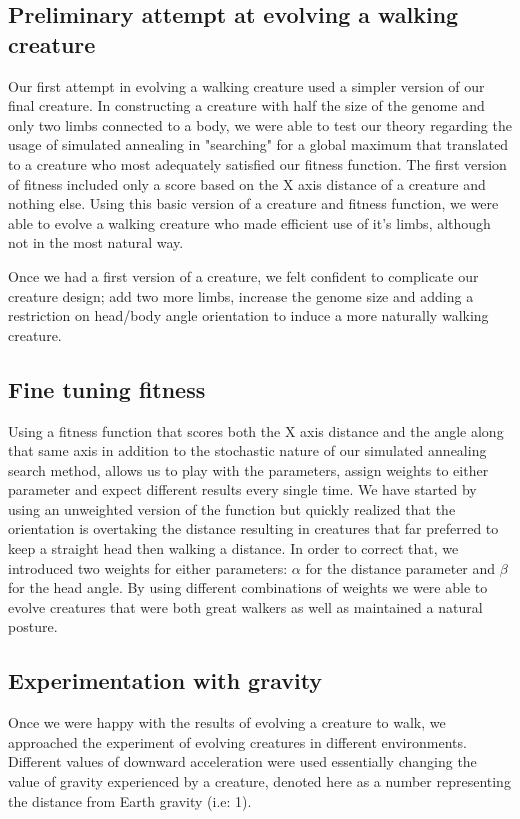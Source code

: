 \documentclass[letterpaper, 10 pt, conference]{ieeeconf}  %
\begin{document}
\subsection{Preliminary attempt at evolving a walking creature}
Our first attempt in evolving a walking creature used a simpler version of our final creature. In constructing a creature with half the size of the genome and only two limbs connected to a body, we were able to test our theory regarding the usage of simulated annealing in "searching" for a global maximum that translated to a creature who most adequately satisfied our fitness function. The first version of fitness included only a score based on the X axis distance of a creature and nothing else.
Using this basic version of a creature and fitness function, we were able to evolve a walking creature who made efficient use of it's limbs, although not in the most natural way.

Once we had a first version of a creature, we felt confident to complicate our creature design; add two more limbs, increase the genome size and adding a restriction on head/body angle orientation to induce a more naturally walking creature.

\subsection{Fine tuning fitness}
Using a fitness function that scores both the X axis distance and the angle along that same axis in addition to the stochastic nature of our simulated annealing search method, allows us to play with the parameters, assign weights to either parameter and expect different results every single time. We have started by using an unweighted version of the function but quickly realized that the orientation is overtaking the distance resulting in creatures that far preferred to keep a straight head then walking a distance. In order to correct that, we introduced two weights for either parameters: $\alpha$ for the distance parameter and $\beta$ for the head angle. 
By using different combinations of weights we were able to evolve creatures that were both great walkers as well as maintained a natural posture.
   
\subsection{Experimentation with gravity}
Once we were happy with the results of evolving a creature to walk, we approached the experiment of evolving creatures in different environments. Different values of downward acceleration were used essentially changing the value of gravity experienced by a creature, denoted here as a number representing the distance from Earth gravity (i.e: 1).
\end{document}
